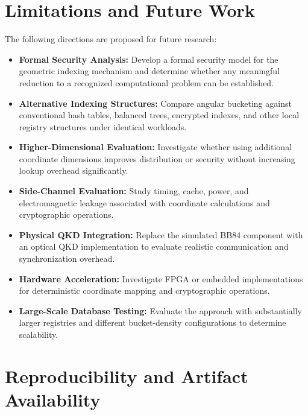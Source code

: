 \documentclass[journal,twocolumn]{IEEEtran}
\begin{document}
\section{Limitations and Future Work}

The following directions are proposed for future research:

\begin{itemize}
    \item \textbf{Formal Security Analysis:} Develop a formal security model for the geometric indexing mechanism and determine whether any meaningful reduction to a recognized computational problem can be established.
    
    \item \textbf{Alternative Indexing Structures:} Compare angular bucketing against conventional hash tables, balanced trees, encrypted indexes, and other local registry structures under identical workloads.
    
    \item \textbf{Higher-Dimensional Evaluation:} Investigate whether using additional coordinate dimensions improves distribution or security without increasing lookup overhead significantly.
    
    \item \textbf{Side-Channel Evaluation:} Study timing, cache, power, and electromagnetic leakage associated with coordinate calculations and cryptographic operations.
    
    \item \textbf{Physical QKD Integration:} Replace the simulated BB84 component with an optical QKD implementation to evaluate realistic communication and synchronization overhead.
    
    \item \textbf{Hardware Acceleration:} Investigate FPGA or embedded implementations for deterministic coordinate mapping and cryptographic operations.
    
    \item \textbf{Large-Scale Database Testing:} Evaluate the approach with substantially larger registries and different bucket-density configurations to determine scalability.
\end{itemize}

\section{Reproducibility and Artifact Availability}
\end{document}
